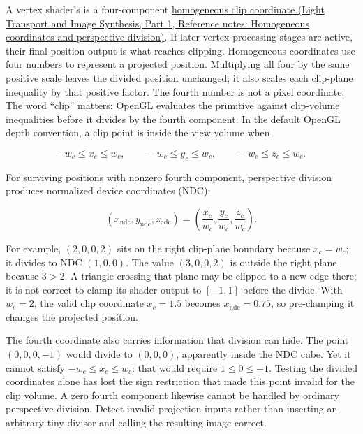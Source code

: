 \hypertarget{06-engine-ii-ch025-clip-coordinates-are-not-normalized-device-coordinates}{}

A vertex shader's  is a four-component \href{../04-Light-Transport-and-Image-Synthesis-P01/main.pdf\#nameddest=appendix-cb3b26862282}{homogeneous clip coordinate (Light Transport and Image Synthesis, Part 1, Reference notes: Homogeneous coordinates and perspective division)}. If later vertex-processing stages are active, their final position output is what reaches clipping. Homogeneous coordinates use four numbers to represent a projected position. Multiplying all four by the same positive scale leaves the divided position unchanged; it also scales each clip-plane inequality by that positive factor. The fourth number is not a pixel coordinate. The word ``clip'' matters: OpenGL evaluates the primitive against clip-volume inequalities before it divides by the fourth component. In the default OpenGL depth convention, a clip point is inside the view volume when

\[
-w_c\le x_c\le w_c,\qquad
-w_c\le y_c\le w_c,\qquad
-w_c\le z_c\le w_c.
\]

For surviving positions with nonzero fourth component, perspective division produces normalized device coordinates (NDC):

\[
(x_{\mathrm{ndc}},y_{\mathrm{ndc}},z_{\mathrm{ndc}})=
\left(\frac{x_c}{w_c},\frac{y_c}{w_c},\frac{z_c}{w_c}\right).
\]

For example, \((2,0,0,2)\) sits on the right clip-plane boundary because \(x_c=w_c\); it divides to NDC \((1,0,0)\). The value \((3,0,0,2)\) is outside the right plane because \(3>2\). A triangle crossing that plane may be clipped to a new edge there; it is not correct to clamp its shader output to \([-1,1]\) before the divide. With \(w_c=2\), the valid clip coordinate \(x_c=1.5\) becomes \(x_{\mathrm{ndc}}=0.75\), so pre-clamping it changes the projected position.

The fourth coordinate also carries information that division can hide. The point \((0,0,0,-1)\) would divide to \((0,0,0)\), apparently inside the NDC cube. Yet it cannot satisfy \(-w_c\leq x_c\leq w_c\): that would require \(1\leq0\leq-1\). Testing the divided coordinates alone has lost the sign restriction that made this point invalid for the clip volume. A zero fourth component likewise cannot be handled by ordinary perspective division. Detect invalid projection inputs rather than inserting an arbitrary tiny divisor and calling the resulting image correct.


